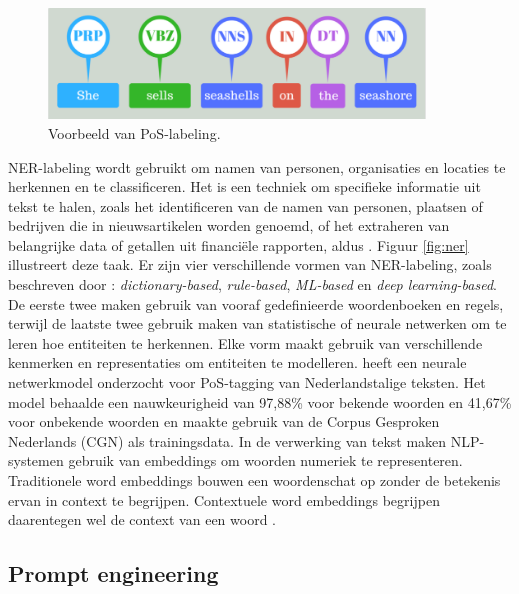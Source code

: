 \begin{figure}[H]
	\begin{center}
		\includegraphics[width=10cm]{img/poslabeling.png}
	\end{center}
	\caption{Voorbeeld van PoS-labeling. }
	\label{fig:pos-labeling}
\end{figure}

\medspace

NER-labeling wordt gebruikt om namen van personen, organisaties en locaties te herkennen en te classificeren. Het is een techniek om specifieke informatie uit tekst te halen, zoals het identificeren van de namen van personen, plaatsen of bedrijven die in nieuwsartikelen worden genoemd, of het extraheren van belangrijke data of getallen uit financiële rapporten, aldus \textcite{Jurafsky2014}. Figuur \ref{fig:ner} illustreert deze taak. Er zijn vier verschillende vormen van NER-labeling, zoals beschreven door \textcite{Li2018}: \textit{dictionary-based}, \textit{rule-based}, \textit{ML-based} en \textit{deep learning-based}. De eerste twee maken gebruik van vooraf gedefinieerde woordenboeken en regels, terwijl de laatste twee gebruik maken van statistische of neurale netwerken om te leren hoe entiteiten te herkennen. Elke vorm maakt gebruik van verschillende kenmerken en representaties om entiteiten te modelleren. \textcite{Poel2008} heeft een neurale netwerkmodel onderzocht voor PoS-tagging van Nederlandstalige teksten. Het model behaalde een nauwkeurigheid van 97,88\% voor bekende woorden en 41,67\% voor onbekende woorden en maakte gebruik van de Corpus Gesproken Nederlands (CGN) als trainingsdata. In de verwerking van tekst maken NLP-systemen gebruik van embeddings om woorden numeriek te representeren. Traditionele word embeddings bouwen een woordenschat op zonder de betekenis ervan in context te begrijpen. Contextuele word embeddings begrijpen daarentegen wel de context van een woord \autocite{Eisenstein2019}. 

\subsection{Prompt engineering}

